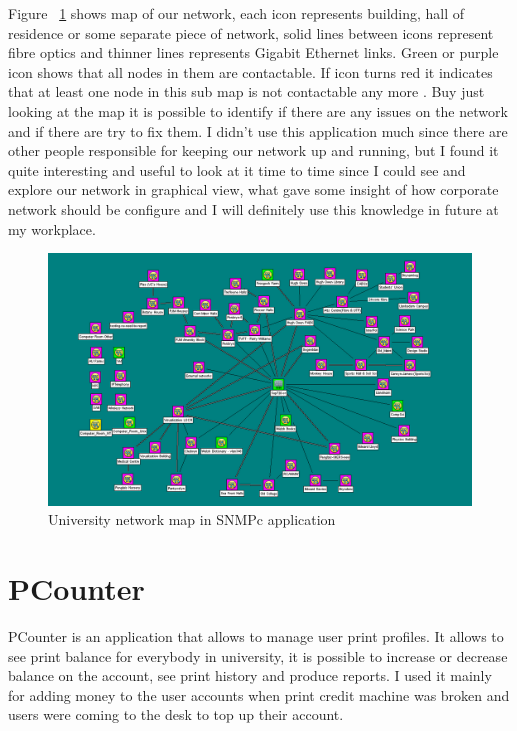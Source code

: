 \documentclass[10pt,a4paper,headinclude=true]{report}
\begin{document}
Figure ~\ref{fig:SNMPc_main} shows map of our network, each icon represents building, hall of residence or some separate piece of network, solid lines between icons represent fibre optics and thinner lines represents Gigabit Ethernet links. Green or purple icon shows that all nodes in them are contactable. If icon turns red it indicates that at least one node in this sub map is not contactable any more \cite{SNPMcSharePoint}. Buy just looking at the map it is possible to identify if there are any issues on the network and if there are try to fix them. I didn't use this application much since there are other people responsible for keeping our network up and running, but I found it quite interesting and useful to look at it time to time since I could see and explore our network in graphical view, what gave some insight of how corporate network should be configure and I will definitely use this knowledge in future at my workplace.

\begin{figure}[H]
\centering
\centerline{\includegraphics[scale=0.5]{./SNMPc_main}}
\caption{University network map in SNMPc application}
\label{fig:SNMPc_main}
\end{figure}

\section{PCounter}
PCounter is an application that allows to  manage user print profiles. It allows to see print balance for everybody in university, it is possible to increase or decrease balance on the account, see print history and produce reports. I used it mainly for adding money to the user accounts when print credit machine was broken and users were coming to the desk to top up their account.
\end{document}
